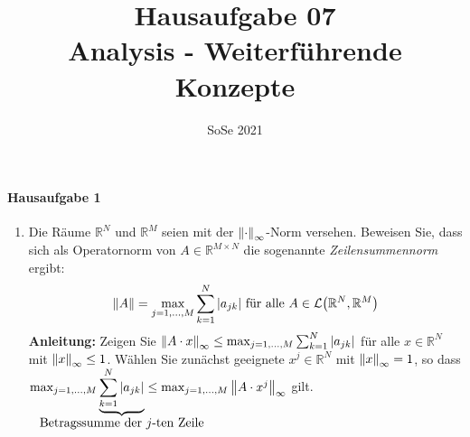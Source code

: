 \documentclass{scrreprt}
\author{}
\date{SoSe 2021}
\title{Hausaufgabe 07 \\Analysis - Weiterführende Konzepte}
\begin{document}
\paragraph{Hausaufgabe 1}
\begin{enumerate}[1)]
\item Die Räume $\mathbb{R}^N$ und $\mathbb{R}^M$ seien mit der
  $\norm{\cdot}_{\infty}$-Norm versehen.
  Beweisen Sie, dass sich als Operatornorm von $A \in \mathbb{R}^{M \times N}$
  die sogenannte \textit{Zeilensummennorm} ergibt:
  \[
    \norm{A} = \max_{j = 1, \ldots, M} \sum_{k = 1}^N \abs{a_{jk}}
    \text{ für alle } A \in \mathcal{L}\qty(\mathbb{R}^N, \mathbb{R}^M)
  \]
  \textbf{Anleitung:} Zeigen Sie
  $\norm{A \cdot x}_{\infty} \leq \max_{j = 1, \ldots, M} \sum_{k = 1}^N \abs{a_{jk}}$
  für alle $x \in \mathbb{R}^N$ mit $\norm{x}_{\infty} \leq 1$.
  Wählen Sie zunächst geeignete $x^j \in \mathbb{R}^N$ mit
  $\norm{x}_{\infty} = 1$, so dass
  $\max_{j = 1, \ldots, M} \underset{\makebox[0pt]{Betragssumme der $j$-ten Zeile}}{\underbrace{\sum_{k = 1}^N \abs{a_{jk}}}}
  \leq \max_{j = 1, \ldots, M} \norm{A \cdot x^j}_{\infty}$
  gilt.


\end{enumerate}
\end{document}
